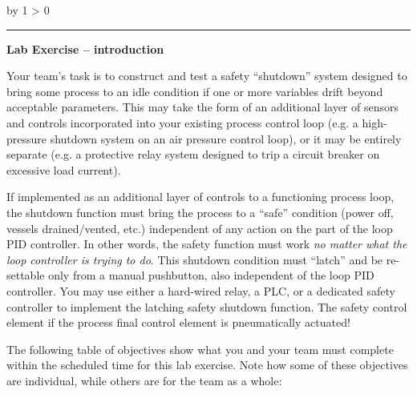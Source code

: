 \documentclass[12pt,a4paper]{article}
\def\oppgave{
            \advance\questnum by 1
            \ifnum \questnum > 0
                 \hrule
                 \vskip 3pt
                 \leftline{Oppgave \the\questnum}
                 \vskip 3pt \fi}
\begin{document}
\begin{itemize}

\vfil \eject 



\oppgave{} 

\noindent
{\bf Lab Exercise -- introduction}

\vskip 5pt

Your team's task is to construct and test a safety ``shutdown'' system designed to bring some process to an idle condition if one or more variables drift beyond acceptable parameters.  This may take the form of an additional layer of sensors and controls incorporated into your existing process control loop (e.g. a high-pressure shutdown system on an air pressure control loop), or it may be entirely separate (e.g. a protective relay system designed to trip a circuit breaker on excessive load current).

If implemented as an additional layer of controls to a functioning process loop, the shutdown function must bring the process to a ``safe'' condition (power off, vessels drained/vented, etc.) independent of any action on the part of the loop PID controller.  In other words, the safety function must work {\it no matter what the loop controller is trying to do}.  This shutdown condition must ``latch'' and be re-settable only from a manual pushbutton, also independent of the loop PID controller.  You may use either a hard-wired relay, a PLC, or a dedicated safety controller to implement the latching safety shutdown function.  The safety control element  if the process final control element is pneumatically actuated!

The following table of objectives show what you and your team must complete within the scheduled time for this lab exercise.  Note how some of these objectives are individual, while others are for the team as a whole:




\end{itemize}
\end{document}
